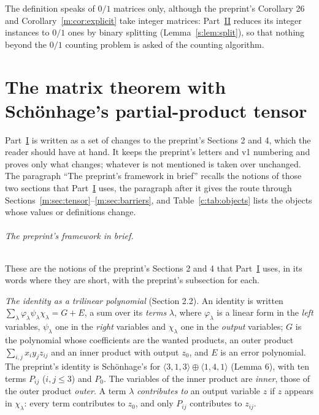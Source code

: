 \documentclass[11pt]{article}
\theoremstyle{definition}
\theoremstyle{remark}
\begin{document}
The definition speaks of $0/1$ matrices only, although the preprint's Corollary 26 and Corollary~\ref{m:cor:explicit} take integer matrices: Part~\hyperref[m:partII]{II} reduces its integer instances to $0/1$ ones by binary splitting (Lemma~\ref{s:lem:split}), so that nothing beyond the $0/1$ counting problem is asked of the counting algorithm.

\part{The matrix theorem with Schönhage's partial-product tensor}\label{m:partI}

Part~\hyperref[m:partI]{I} is written as a set of changes to the preprint's Sections 2 and 4, which the reader should have at hand. It keeps the preprint's letters and v1 numbering and proves only what changes; whatever is not mentioned is taken over unchanged. The paragraph ``The preprint's framework in brief'' recalls the notions of those two sections that Part~\hyperref[m:partI]{I} uses, the paragraph after it gives the route through Sections~\ref{m:sec:tensor}--\ref{m:sec:barriers}, and Table~\ref{c:tab:objects} lists the objects whose values or definitions change.

\paragraph{The preprint's framework in brief.} These are the notions of the preprint's Sections 2 and 4 that Part~\hyperref[m:partI]{I} uses, in its words where they are short, with the preprint's subsection for each.

\emph{The identity as a trilinear polynomial} (Section 2.2). An identity is written $\sum_\lambda\varphi_\lambda\psi_\lambda\chi_\lambda=G+E$, a sum over its \emph{terms} $\lambda$, where $\varphi_\lambda$ is a linear form in the \emph{left} variables, $\psi_\lambda$ one in the \emph{right} variables and $\chi_\lambda$ one in the \emph{output} variables; $G$ is the polynomial whose coefficients are the wanted products, an outer product $\sum_{i,j}x_iy_jz_{ij}$ and an inner product with output $z_0$, and $E$ is an error polynomial. The preprint's identity is Schönhage's for $\langle3,1,3\rangle\oplus\langle1,4,1\rangle$ (Lemma 6), with ten terms $P_{ij}$ ($i,j\le3$) and $P_0$. The variables of the inner product are \emph{inner}, those of the outer product \emph{outer}. A term $\lambda$ \emph{contributes to} an output variable $z$ if $z$ appears in $\chi_\lambda$: every term contributes to $z_0$, and only $P_{ij}$ contributes to $z_{ij}$.
\end{document}
